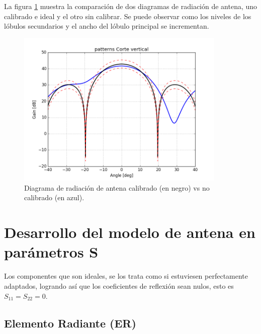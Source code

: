La figura \ref{fig:nonCalPattern} muestra la comparación de dos diagramas de radiación de antena, uno calibrado e ideal y el
otro sin calibrar. Se puede observar como los niveles de los lóbulos secundarios y el ancho del lóbulo principal se incrementan.
\begin{figure}[H]
 \centering
 \includegraphics[width=10cm]{gfx/nonCalPattern.png}
 \caption{Diagrama de radiación de antena calibrado (en negro) vs no calibrado (en azul).}
 \label{fig:nonCalPattern}
\end{figure}


\section{Desarrollo del modelo de antena en parámetros S}

Los componentes que son ideales, se los trata como si estuviesen perfectamente adaptados, logrando así que los coeficientes
de reflexión sean nulos, esto es $S_{11} = S_{22} = 0$. 


\subsection{Elemento Radiante (ER)}

